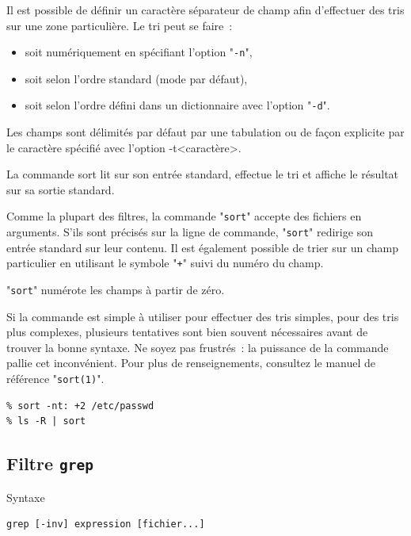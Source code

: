 {Il est possible de d{\'e}finir un caract{\`e}re s{\'e}parateur de champ afin
d'effectuer des tris sur une zone particuli{\`e}re. Le tri peut se faire~:
\begin{itemize}
	\item soit num{\'e}riquement en sp{\'e}cifiant l'option "{\tt -n}",
	\item soit selon l'ordre {\ASCII} standard (mode par d{\'e}faut),
	\item soit selon l'ordre d{\'e}fini dans un dictionnaire avec l'option
		  "{\tt -d}".
\end{itemize}

Les champs sont d{\'e}limit{\'e}s par d{\'e}faut par une tabulation ou de fa\c{c}on
explicite par le caract{\`e}re sp{\'e}cifi{\'e} avec l'option -t<caract{\`e}re>.

La commande sort lit sur son entr{\'e}e standard, effectue le tri et affiche
le r{\'e}sultat sur sa sortie standard.

Comme la plupart des filtres, la commande "{\tt sort}" accepte des
fichiers en arguments. S'ils sont pr{\'e}cis{\'e}s sur la ligne de commande,
"{\tt sort}" redirige son entr{\'e}e standard sur leur contenu. Il est
{\'e}galement possible de trier sur un champ particulier en utilisant le
symbole "{\tt +}" suivi du num{\'e}ro du champ.

\begin{remarque}
"{\tt sort}" num{\'e}rote les champs {\`a} partir de z{\'e}ro.
\end{remarque}

Si la commande est simple {\`a} utiliser pour effectuer des tris simples,
pour des tris plus complexes, plusieurs tentatives sont bien souvent
n{\'e}cessaires avant de trouver la bonne syntaxe. Ne soyez pas frustr{\'e}s~: la
puissance de la commande pallie cet inconv{\'e}nient. Pour plus de
renseignements, consultez le manuel de r{\'e}f{\'e}rence "{\tt sort(1)}".

\begin{example}
\begin{verbatim}
% sort -nt: +2 /etc/passwd
% ls -R | sort
\end{verbatim}
\end{example}

\subsection{Filtre {\tt grep}}

\begin{definition}{Syntaxe}
\begin{verbatim}
grep [-inv] expression [fichier...]
\end{verbatim}
\end{definition}

}
